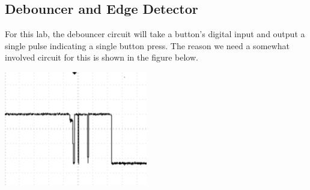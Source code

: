 \documentclass[11pt]{article}
\begin{document}





\subsection{Debouncer and Edge Detector}

For this lab, the debouncer circuit will take a button's digital input and output a single pulse indicating a single button press. The reason we need a somewhat involved circuit for this is shown in the figure below.

\begin{center}
\includegraphics[height=5cm]{images/lab2_fig4.png}
\end{center}
\end{document}
